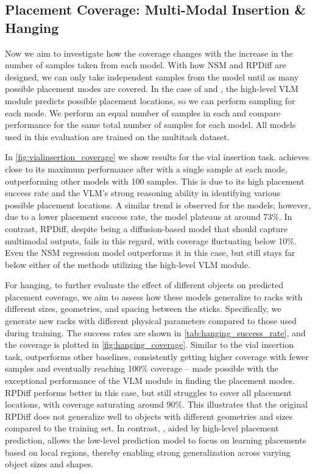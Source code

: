 \subsection{\textbf{Placement Coverage: Multi-Modal Insertion \& Hanging}}

Now we aim to investigate how the coverage changes with the increase in the number of samples taken from each model.
With how NSM and RPDiff are designed, we can only take independent samples from the model until as many possible placement modes are covered.
In the case of \ourmethod and \energyvlm, the high-level VLM module predicts possible placement locations, so we can perform sampling for each mode.
We perform an equal number of samples in each and compare performance for the same total number of samples for each model.
All models used in this evaluation are trained on the multitask dataset.


In \autoref{fig:vialinsertion_coverage} we show results for the vial insertion task. \ourmethod achieves close to its maximum performance after with a single sample at each mode, outperforming other models with 100 samples. This is due to its high placement success rate and the VLM's strong reasoning ability in identifying various possible placement locations. A similar trend is observed for the \energyvlm models; however, due to 
a lower placement success rate, the model plateaus at around 73\%.
In contrast, RPDiff, despite being a diffusion-based model that should capture multimodal outputs, fails in this regard, with coverage fluctuating below 10\%. Even the NSM regression model outperforms it in this case, but still stays far below either of the methods utilizing the high-level VLM module.



For hanging, to further evaluate the effect of different objects on predicted placement coverage, we aim to assess how these models generalize to racks with different sizes, geometries, and spacing between the sticks. Specifically, we generate new racks with different physical parameters compared to those used during training. The success rates are shown in \autoref{tab:hanging_success_rate}, and the coverage is plotted in \autoref{fig:hanging_coverage}.
Similar to the vial insertion task, \ourmethod outperforms other baselines, consistently getting higher coverage with fewer samples and eventually reaching 100\% coverage -- made possible with the exceptional performance of the VLM module in finding the placement modes. RPDiff performs better in this case, but still struggles to cover all placement locations, with coverage saturating around 90\%. This illustrates that the original RPDiff does not generalize well to objects with different geometries and sizes compared to the training set. In contrast, \ourmethod, aided by high-level placement prediction, allows the low-level prediction model to focus on learning placements based on local regions, thereby enabling strong generalization across varying object sizes and shapes.


